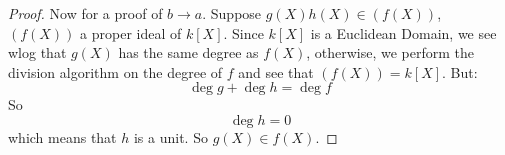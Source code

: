\documentclass{article}
\begin{document}
\begin{proof}
            Now for a proof of $b \rightarrow a$. Suppose $g(X)h(X) \in (f(X))$, $(f(X))$ a proper ideal of $k[X]$. Since $k[X]$ is a Euclidean Domain, we see wlog that $g(X)$ has the same degree as $f(X)$, otherwise, we perform the division algorithm on the degree of $f$ and see that $(f(X)) = k[X]$. But:
                \begin{equation*}
                    \mathop{deg}g + \mathop{deg}h = \mathop{deg}f
                \end{equation*}
            So 
                \begin{equation*}
                    \mathop{deg}h = 0
                \end{equation*}
            which means that $h$ is a unit. So $g(X) \in f(X)$.
        \end{proof}
\end{document}
